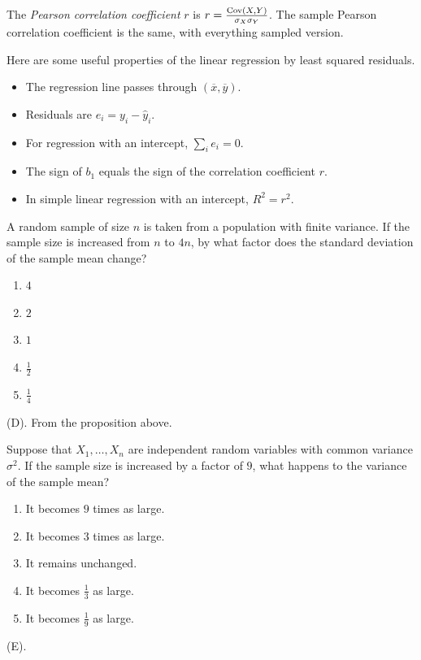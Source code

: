 \begin{df}
The \emph{Pearson correlation coefficient} $r$ is $r = \frac{\operatorname{Cov}(X,Y)}{\sigma_X \sigma_Y}$.
The sample Pearson correlation coefficient is the same, with everything sampled version.
\end{df}

\begin{remark}
Here are some useful properties of the linear regression by least squared residuals.
\begin{itemize}
\item The regression line passes through $(\overline x,\overline y)$.
\item Residuals are $e_i=y_i-\widehat y_i$.
\item For regression with an intercept, $\sum_i e_i=0$.
\item The sign of $b_1$ equals the sign of the correlation coefficient $r$.
\item In simple linear regression with an intercept, $R^2=r^2$.
\end{itemize}
\end{remark}

\begin{exercise}
A random sample of size $n$ is taken from a population with finite variance.
If the sample size is increased from $n$ to $4n$, by what factor does the
standard deviation of the sample mean change?
\begin{enumerate}[label=(\Alph*)]
    \item $4$
    \item $2$
    \item $1$
    \item $\frac{1}{2}$
    \item $\frac{1}{4}$
\end{enumerate}
\end{exercise}
\begin{solution}
(D). From the proposition above. 
\end{solution}

\begin{exercise}
Suppose that $X_1,\ldots,X_n$ are independent random variables with
common variance $\sigma^2$. If the sample size is increased by a factor
of $9$, what happens to the variance of the sample mean?
\begin{enumerate}[label=(\Alph*)]
    \item It becomes $9$ times as large.
    \item It becomes $3$ times as large.
    \item It remains unchanged.
    \item It becomes $\frac{1}{3}$ as large.
    \item It becomes $\frac{1}{9}$ as large.
\end{enumerate}
\end{exercise}
\begin{solution}
(E).
\end{solution}


